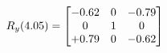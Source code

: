 \documentclass[preview]{standalone}
\begin{document}
\begin{align*}
\special{dvisvgm:raw <g id='unique000'>}R_{y}(4.05) = \begin{bmatrix}-0.62 & 0 & -0.79 \\0 & 1 & 0 \\+0.79 & 0 & -0.62\end{bmatrix}\special{dvisvgm:raw </g>}
\end{align*}
\end{document}
